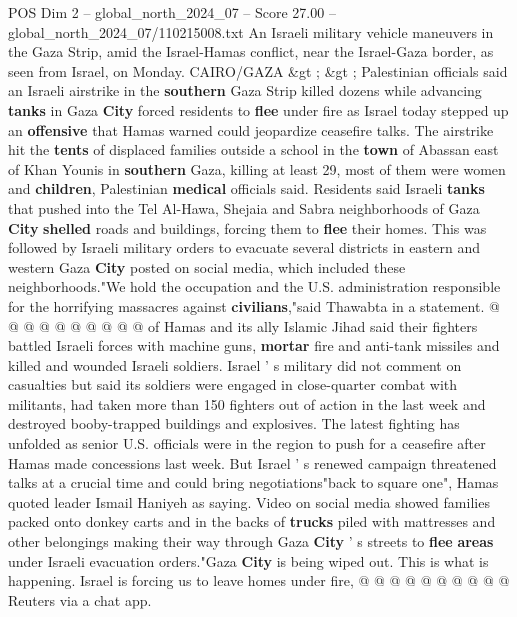 \begin{textsample}{POS Dim 2 – global\_north\_2024\_07 – Score 27.00 – global\_north\_2024\_07/110215008.txt}  \label{ex:f2_pos_388}
An Israeli military vehicle maneuvers in the Gaza Strip, amid the Israel-Hamas conflict, near the Israel-Gaza border, as seen from Israel, on Monday.
CAIRO/GAZA \&gt ; \&gt ; Palestinian officials said an Israeli airstrike in the \textbf{southern} Gaza Strip killed dozens while advancing \textbf{tanks} in Gaza \textbf{City} forced residents to \textbf{flee} under fire as Israel today stepped up an \textbf{offensive} that Hamas warned could jeopardize ceasefire talks.
The airstrike hit the \textbf{tents} of displaced families outside a school in the \textbf{town} of Abassan east of Khan Younis in \textbf{southern} Gaza, killing at least 29, most of them were women and \textbf{children}, Palestinian \textbf{medical} officials said.
Residents said Israeli \textbf{tanks} that pushed into the Tel Al-Hawa, Shejaia and Sabra neighborhoods of Gaza \textbf{City} \textbf{shelled} roads and buildings, forcing them to \textbf{flee} their homes.
This was followed by Israeli military orders to evacuate several districts in eastern and western Gaza \textbf{City} posted on social media, which included these neighborhoods."We hold the occupation and the U.S. administration responsible for the horrifying massacres against \textbf{civilians},"said Thawabta in a statement. @ @ @ @ @ @ @ @ @ @ of Hamas and its ally Islamic Jihad said their fighters battled Israeli forces with machine guns, \textbf{mortar} fire and anti-tank missiles and killed and wounded Israeli soldiers.
Israel ' s military did not comment on casualties but said its soldiers were engaged in close-quarter combat with militants, had taken more than 150 fighters out of action in the last week and destroyed booby-trapped buildings and explosives.
The latest fighting has unfolded as senior U.S. officials were in the region to push for a ceasefire after Hamas made concessions last week.
But Israel ' s renewed campaign threatened talks at a crucial time and could bring negotiations"back to square one", Hamas quoted leader Ismail Haniyeh as saying.
Video on social media showed families packed onto donkey carts and in the backs of \textbf{trucks} piled with mattresses and other belongings making their way through Gaza \textbf{City} ' s streets to \textbf{flee} \textbf{areas} under Israeli evacuation orders."Gaza \textbf{City} is being wiped out.
This is what is happening.
Israel is forcing us to leave homes under fire, @ @ @ @ @ @ @ @ @ @ Reuters via a chat app.

\end{textsample}
